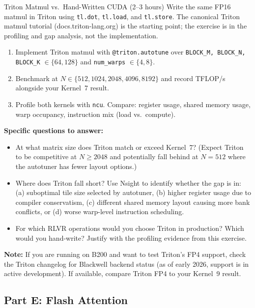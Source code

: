 \begin{exercise}{Triton Matmul vs.\ Hand-Written CUDA (2--3 hours)}
Write the same FP16 matmul in Triton using \texttt{tl.dot}, \texttt{tl.load}, and \texttt{tl.store}. The canonical Triton matmul tutorial (docs.triton-lang.org) is the starting point; the exercise is in the profiling and gap analysis, not the implementation.

\begin{enumerate}
  \item Implement Triton matmul with \texttt{@triton.autotune} over \texttt{BLOCK\_M, BLOCK\_N, BLOCK\_K} $\in \{64, 128\}$ and \texttt{num\_warps} $\in \{4, 8\}$.
  \item Benchmark at $N \in \{512, 1024, 2048, 4096, 8192\}$ and record TFLOP/s alongside your Kernel~7 result.
  \item Profile both kernels with \texttt{ncu}. Compare: register usage, shared memory usage, warp occupancy, instruction mix (load vs.\ compute).
\end{enumerate}

\textbf{Specific questions to answer:}
\begin{itemize}
  \item At what matrix size does Triton match or exceed Kernel~7? (Expect Triton to be competitive at $N \geq 2048$ and potentially fall behind at $N = 512$ where the autotuner has fewer layout options.)
  \item Where does Triton fall short? Use Nsight to identify whether the gap is in: (a) suboptimal tile size selected by autotuner, (b) higher register usage due to compiler conservatism, (c) different shared memory layout causing more bank conflicts, or (d) worse warp-level instruction scheduling.
  \item For which RLVR operations would you choose Triton in production? Which would you hand-write? Justify with the profiling evidence from this exercise.
\end{itemize}

\textbf{Note:} If you are running on B200 and want to test Triton's FP4 support, check the Triton changelog for Blackwell backend status (as of early 2026, support is in active development). If available, compare Triton FP4 to your Kernel~9 result.
\end{exercise}

\subsection{Part E: Flash Attention}

